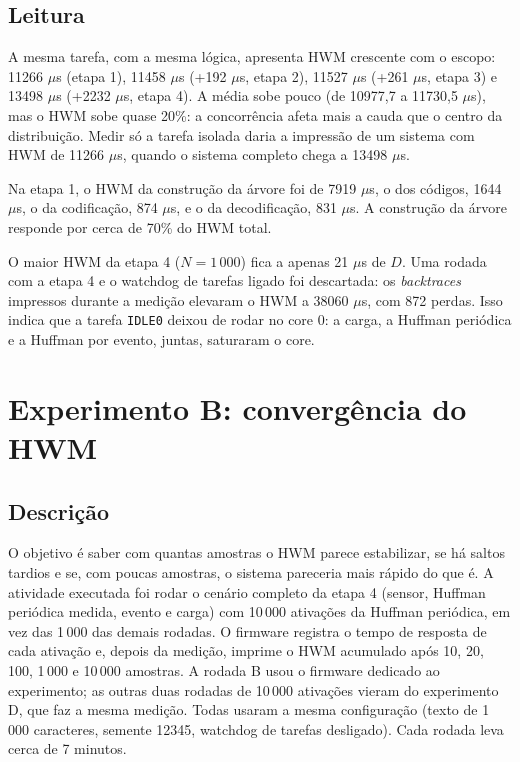 \documentclass[conference,a4paper]{IEEEtran}
\begin{document}
\subsection{Leitura}
A mesma tarefa, com a mesma lógica, apresenta HWM crescente com o escopo: 11266 $\mu$s (etapa 1), 11458 $\mu$s (+192 $\mu$s, etapa 2), 11527 $\mu$s (+261 $\mu$s, etapa 3) e 13498 $\mu$s (+2232 $\mu$s, etapa 4). A média sobe pouco (de 10977,7 a 11730,5 $\mu$s), mas o HWM sobe quase 20\%: a concorrência afeta mais a cauda que o centro da distribuição. Medir só a tarefa isolada daria a impressão de um sistema com HWM de 11266 $\mu$s, quando o sistema completo chega a 13498 $\mu$s.

Na etapa 1, o HWM da construção da árvore foi de 7919 $\mu$s, o dos códigos, 1644 $\mu$s, o da codificação, 874 $\mu$s, e o da decodificação, 831 $\mu$s. A construção da árvore responde por cerca de 70\% do HWM total.

O maior HWM da etapa 4 ($N = 1\,000$) fica a apenas 21 $\mu$s de $D$. Uma rodada com a etapa 4 e o watchdog de tarefas ligado foi descartada: os \emph{backtraces} impressos durante a medição elevaram o HWM a 38060 $\mu$s, com 872 perdas. Isso indica que a tarefa \texttt{IDLE0} deixou de rodar no core 0: a carga, a Huffman periódica e a Huffman por evento, juntas, saturaram o core.

\section{Experimento B: convergência do HWM}
\subsection{Descrição}
O objetivo é saber com quantas amostras o HWM parece estabilizar, se há saltos tardios e se, com poucas amostras, o sistema pareceria mais rápido do que é. A atividade executada foi rodar o cenário completo da etapa 4 (sensor, Huffman periódica medida, evento e carga) com 10\,000 ativações da Huffman periódica, em vez das 1\,000 das demais rodadas. O firmware registra o tempo de resposta de cada ativação e, depois da medição, imprime o HWM acumulado após 10, 20, 100, 1\,000 e 10\,000 amostras. A rodada B usou o firmware dedicado ao experimento; as outras duas rodadas de 10\,000 ativações vieram do experimento D, que faz a mesma medição. Todas usaram a mesma configuração (texto de 1\,000 caracteres, semente 12345, watchdog de tarefas desligado). Cada rodada leva cerca de 7 minutos.
\end{document}
